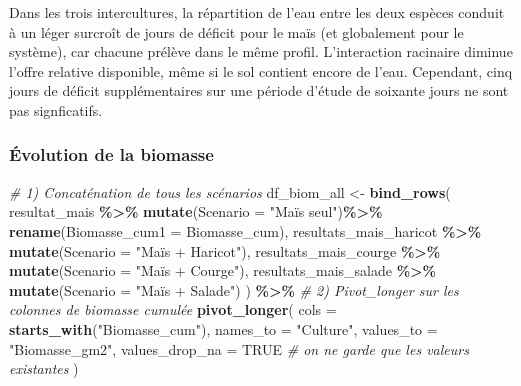 \documentclass[
]{article}
\newenvironment{Shaded}{\begin{snugshade}}{\end{snugshade}}
\newcommand{\AttributeTok}[1]{\textcolor[rgb]{0.13,0.29,0.53}{#1}}
\newcommand{\CommentTok}[1]{\textcolor[rgb]{0.56,0.35,0.01}{\textit{#1}}}
\newcommand{\ConstantTok}[1]{\textcolor[rgb]{0.56,0.35,0.01}{#1}}
\newcommand{\FunctionTok}[1]{\textcolor[rgb]{0.13,0.29,0.53}{\textbf{#1}}}
\newcommand{\NormalTok}[1]{#1}
\newcommand{\OtherTok}[1]{\textcolor[rgb]{0.56,0.35,0.01}{#1}}
\newcommand{\SpecialCharTok}[1]{\textcolor[rgb]{0.81,0.36,0.00}{\textbf{#1}}}
\newcommand{\StringTok}[1]{\textcolor[rgb]{0.31,0.60,0.02}{#1}}
\begin{document}
Dans les trois intercultures, la répartition de l'eau entre les deux
espèces conduit à un léger surcroît de jours de déficit pour le maïs (et
globalement pour le système), car chacune prélève dans le même profil.
L'interaction racinaire diminue l'offre relative disponible, même si le
sol contient encore de l'eau. Cependant, cinq jours de déficit
supplémentaires sur une période d'étude de soixante jours ne sont pas
signficatifs.

\subsubsection{Évolution de la
biomasse}\label{uxe9volution-de-la-biomasse}

\begin{Shaded}
\begin{Highlighting}[]
\CommentTok{\# 1) Concaténation de tous les scénarios}
\NormalTok{df\_biom\_all }\OtherTok{\textless{}{-}} \FunctionTok{bind\_rows}\NormalTok{(}
\NormalTok{  resultat\_mais          }\SpecialCharTok{\%\textgreater{}\%} \FunctionTok{mutate}\NormalTok{(}\AttributeTok{Scenario =} \StringTok{"Maïs seul"}\NormalTok{)}\SpecialCharTok{\%\textgreater{}\%} \FunctionTok{rename}\NormalTok{(}\AttributeTok{Biomasse\_cum1 =}\NormalTok{ Biomasse\_cum),}
\NormalTok{  resultats\_mais\_haricot }\SpecialCharTok{\%\textgreater{}\%} \FunctionTok{mutate}\NormalTok{(}\AttributeTok{Scenario =} \StringTok{"Maïs + Haricot"}\NormalTok{),}
\NormalTok{  resultats\_mais\_courge  }\SpecialCharTok{\%\textgreater{}\%} \FunctionTok{mutate}\NormalTok{(}\AttributeTok{Scenario =} \StringTok{"Maïs + Courge"}\NormalTok{),}
\NormalTok{  resultats\_mais\_salade  }\SpecialCharTok{\%\textgreater{}\%} \FunctionTok{mutate}\NormalTok{(}\AttributeTok{Scenario =} \StringTok{"Maïs + Salade"}\NormalTok{)}
\NormalTok{) }\SpecialCharTok{\%\textgreater{}\%}
  \CommentTok{\# 2) Pivot\_longer sur les colonnes de biomasse cumulée}
  \FunctionTok{pivot\_longer}\NormalTok{(}
    \AttributeTok{cols           =} \FunctionTok{starts\_with}\NormalTok{(}\StringTok{"Biomasse\_cum"}\NormalTok{),}
    \AttributeTok{names\_to       =} \StringTok{"Culture"}\NormalTok{,}
    \AttributeTok{values\_to      =} \StringTok{"Biomasse\_gm2"}\NormalTok{,}
    \AttributeTok{values\_drop\_na =} \ConstantTok{TRUE}    \CommentTok{\# on ne garde que les valeurs existantes}
\NormalTok{  )}


\end{Highlighting}
\end{Shaded}
\end{document}
